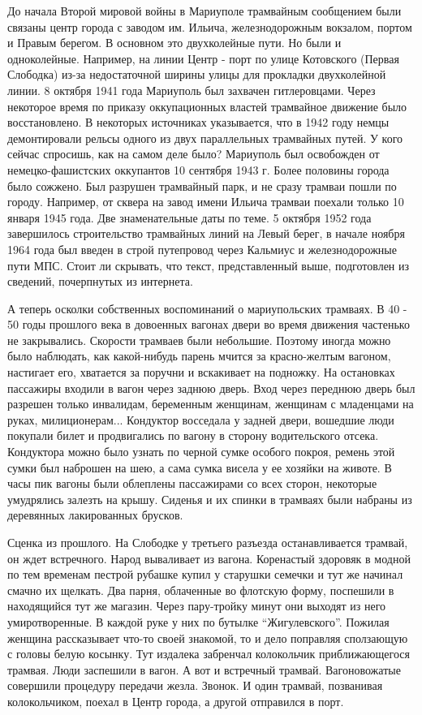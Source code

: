До начала Второй мировой войны в Мариуполе трамвайным сообщением были связаны
центр города с заводом им. Ильича, железнодорожным вокзалом, портом и Правым
берегом. В основном это двухколейные пути. Но были и одноколейные. Например, на
линии Центр - порт по улице Котовского (Первая Слободка) из-за недостаточной
ширины улицы для прокладки двухколейной линии. 8 октября 1941 года Мариуполь
был захвачен гитлеровцами. Через некоторое время по приказу оккупационных
властей трамвайное движение было восстановлено. В некоторых источниках
указывается, что в 1942 году немцы демонтировали рельсы одного из двух
параллельных трамвайных путей. У кого сейчас спросишь, как на самом деле было?
Мариуполь был освобожден от немецко-фашистских оккупантов 10 сентября 1943 г.
Более половины города было сожжено. Был разрушен трамвайный парк, и не сразу
трамваи пошли по городу. Например, от сквера на завод имени Ильича трамваи
поехали только 10 января 1945 года. Две знаменательные даты по теме. 5 октября
1952 года завершилось строительство трамвайных линий на Левый берег, в начале
ноября 1964 года был введен в строй путепровод через Кальмиус и железнодорожные
пути МПС. Стоит ли скрывать, что текст, представленный выше, подготовлен из
сведений, почерпнутых из интернета.


А теперь осколки собственных воспоминаний о мариупольских трамваях. В 40 - 50
годы прошлого века в довоенных вагонах двери во время движения частенько не
закрывались. Скорости трамваев были небольшие. Поэтому иногда можно было
наблюдать, как какой-нибудь парень мчится за красно-желтым вагоном, настигает
его, хватается за поручни и вскакивает на подножку. На остановках пассажиры
входили в вагон через заднюю дверь. Вход через переднюю дверь был разрешен
только инвалидам, беременным женщинам, женщинам с младенцами на руках,
милиционерам... Кондуктор восседала у задней двери, вошедшие люди покупали билет
и продвигались по вагону в сторону водительского отсека. Кондуктора можно было
узнать по черной сумке особого покроя, ремень этой сумки был наброшен на шею, а
сама сумка висела у ее хозяйки на животе. В часы пик вагоны были облеплены
пассажирами со всех сторон, некоторые умудрялись залезть на крышу. Сиденья и их
спинки в трамваях были набраны из деревянных лакированных брусков.

Сценка из прошлого. На Слободке у третьего разъезда останавливается трамвай, он
ждет встречного. Народ вываливает из вагона. Коренастый здоровяк в модной по
тем временам пестрой рубашке купил у старушки семечки и тут же начинал смачно
их щелкать. Два парня, облаченные во флотскую форму, поспешили в находящийся
тут же магазин. Через пару-тройку минут они выходят из него умиротворенные. В
каждой руке у них по бутылке \enquote{Жигулевского}. Пожилая женщина рассказывает
что-то своей знакомой, то и дело поправляя сползающую с головы белую косынку.
Тут издалека забренчал колокольчик приближающегося трамвая. Люди заспешили в
вагон. А вот и встречный трамвай. Вагоновожатые совершили процедуру передачи
жезла. Звонок. И один трамвай, позванивая колокольчиком, поехал в Центр города,
а другой отправился в порт.
